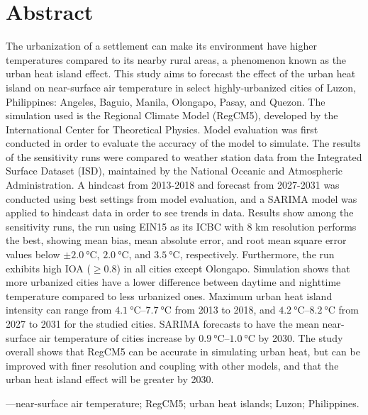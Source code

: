 \chapter{Abstract}

The urbanization of a settlement can make its environment have higher temperatures compared to its nearby rural areas,
	a phenomenon known as the urban heat island effect.
This study aims to forecast the effect of the urban heat island on near-surface air temperature in select highly-urbanized cities of Luzon, Philippines: Angeles, Baguio, Manila, Olongapo, Pasay, and Quezon.
The simulation used is the Regional Climate Model (RegCM5), developed by the International Center for Theoretical Physics.
Model evaluation was first conducted in order to evaluate the accuracy of the model to simulate.
The results of the sensitivity runs were compared to weather station data from the Integrated Surface Dataset (ISD), maintained by the National Oceanic and Atmospheric Administration.
A hindcast from 2013-2018 and forecast from 2027-2031 was conducted using best settings from model evaluation, and a SARIMA model was applied to hindcast data in order to see trends in data.
Results show among the sensitivity runs, the run using EIN15 as its ICBC with 8 km resolution performs the best, showing mean bias, mean absolute error, and root mean square error values below $\pm \qty{2.0}{\degreeCelsius}$, $\qty{2.0}{\degreeCelsius}$, and $\qty{3.5}{\degreeCelsius}$, respectively.
Furthermore, the run exhibits high IOA ($\geq \num{0.8}$) in all cities except Olongapo.
Simulation shows that more urbanized cities have a lower difference between daytime and nighttime temperature compared to less urbanized ones.
Maximum urban heat island intensity can range from
$\qtyrange{4.1}{7.7}{\degreeCelsius}$ from 2013 to 2018, and
$\qtyrange{4.2}{8.2}{\degreeCelsius}$ from 2027 to 2031 for the studied cities.
SARIMA forecasts to have the mean near-surface air temperature of cities increase by $\qtyrange{0.9}{1.0}{\degreeCelsius}$ by 2030.
The study overall shows that RegCM5 can be accurate in simulating urban heat, but can be improved with finer resolution and coupling with other models, and that 
the urban heat island effect will be greater by 2030.

\vspace{3ex} ---near-surface air temperature; RegCM5; urban heat islands; Luzon; Philippines.

%
